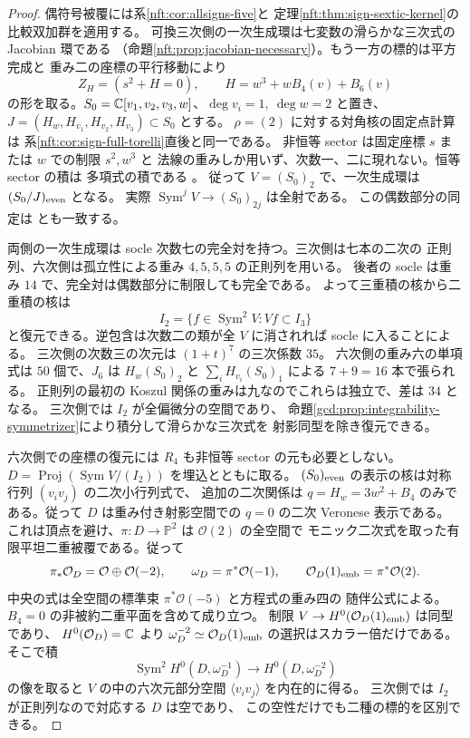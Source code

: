 \begin{proof}
偶符号被覆には系\ref{nft:cor:allsigns-five}と
定理\ref{nft:thm:sign-sextic-kernel}の比較双加群を適用する。
可換三次側の一次生成環は七変数の滑らかな三次式の Jacobian 環である
（命題\ref{nft:prop:jacobian-necessary}）。もう一方の標的は平方完成と
重み二の座標の平行移動により
\[
 Z_H=(s^2+H=0),\qquad H=w^3+wB_4(v)+B_6(v)
\]
の形を取る。$S_0=\mathbb C[v_1,v_2,v_3,w]$、$\deg v_i=1,\ \deg w=2$ と置き、$J=(H_w,H_{v_1},H_{v_2},H_{v_3})\subset S_0$ とする。
$\rho=(2)$ に対する対角核の固定点計算は
系\ref{nft:cor:sign-full-torelli}直後と同一である。
非恒等 sector は固定座標 $s$ または $w$ での制限 $s^2,w^3$ と
法線の重みしか用いず、次数一、二に現れない。恒等 sector の積は
多項式の積である \cite[Theorem~5.39 の証明]{NFBFKKernels}。
従って $V=(S_0)_2$ で、一次生成環は $(S_0/J)_{\rm even}$ となる。
実際 $\operatorname{Sym}^j V\to (S_0)_{2j}$ は全射である。
この偶数部分の同定は \cite[Theorem~4.3]{SignLRZVeronese} とも一致する。

両側の一次生成環は socle 次数七の完全対を持つ。三次側は七本の二次の
正則列、六次側は孤立性による重み $4,5,5,5$ の正則列を用いる。
後者の socle は重み $14$ で、完全対は偶数部分に制限しても完全である。
よって三重積の核から二重積の核は
\[
 I_2=\{f\in\operatorname{Sym}^2V: Vf\subset I_3\}
\]
と復元できる。逆包含は次数二の類が全 $V$ に消されれば socle に入ることによる。
三次側の次数三の次元は $(1+t)^7$ の三次係数 $35$。
六次側の重み六の単項式は $50$ 個で、$J_6$ は $H_w(S_0)_2$ と
$\sum_i H_{v_i}(S_0)_1$ による $7+9=16$ 本で張られる。
正則列の最初の Koszul 関係の重みは九なのでこれらは独立で、差は $34$ となる。
三次側では $I_2$ が全偏微分の空間であり、
命題\ref{gcd:prop:integrability-symmetrizer}により積分して滑らかな三次式を
射影同型を除き復元できる。

六次側での座標の復元には $R_4$ も非恒等 sector の元も必要としない。
$D=\operatorname{Proj}(\operatorname{Sym}V/(I_2))$ を埋込とともに取る。
$(S_0)_{\rm even}$ の表示の核は対称行列 $(v_iv_j)$ の二次小行列式で、
追加の二次関係は $q=H_w=3w^2+B_4$ のみである。従って
$D$ は重み付き射影空間での $q=0$ の二次 Veronese 表示である。
これは頂点を避け、$\pi:D\to\mathbb P^2$ は $\mathcal O(2)$ の全空間で
モニック二次式を取った有限平坦二重被覆である。従って
\[
 \pi_*\mathcal O_D=\mathcal O\oplus\mathcal O(-2),\qquad
 \omega_D=\pi^*\mathcal O(-1),\qquad
 \mathcal O_D(1)_{\rm emb}=\pi^*\mathcal O(2).
\]
中央の式は全空間の標準束 $\pi^*\mathcal O(-5)$ と方程式の重み四の
随伴公式による。$B_4=0$ の非被約二重平面を含めて成り立つ。
制限 $V\to H^0(\mathcal O_D(1)_{\rm emb})$ は同型であり、
$H^0(\mathcal O_D)=\mathbb C$ より $\omega_D^{-2}\simeq\mathcal O_D(1)_{\rm emb}$
の選択はスカラー倍だけである。そこで積
\[
 \operatorname{Sym}^2H^0(D,\omega_D^{-1})\longrightarrow H^0(D,\omega_D^{-2})
\]
の像を取ると $V$ の中の六次元部分空間 $\langle v_iv_j\rangle$ を内在的に得る。
三次側では $I_2$ が正則列なので対応する $D$ は空であり、
この空性だけでも二種の標的を区別できる。


\end{proof}

